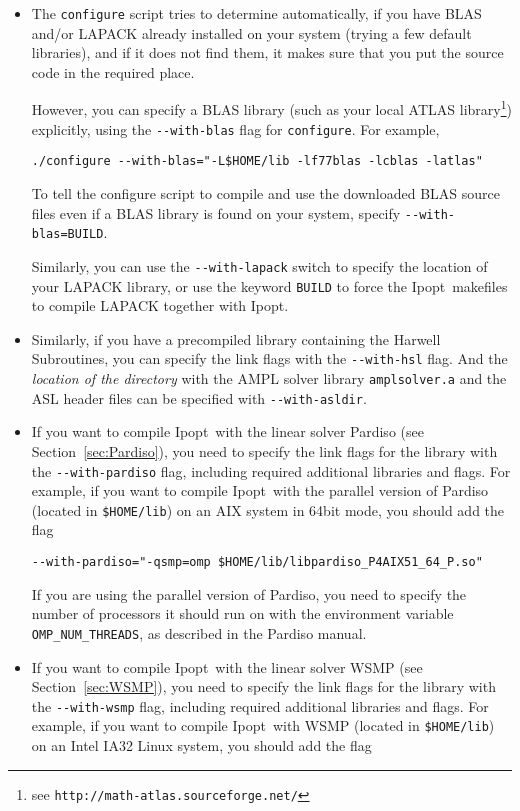 \documentclass[10pt]{article}
\newcommand{\Ipopt}{{\sc Ipopt}}
\begin{document}
\begin{itemize}
\item The {\tt configure} script tries to determine automatically, if
  you have BLAS and/or LAPACK already installed on your system (trying
  a few default libraries), and if it does not find them, it makes
  sure that you put the source code in the required place.

  However, you can specify a BLAS library (such as your local ATLAS
  library\footnote{see {\tt http://math-atlas.sourceforge.net/}})
  explicitly, using the \verb/--with-blas/ flag for {\tt configure}.
  For example,

  \verb|./configure --with-blas="-L$HOME/lib -lf77blas -lcblas -latlas"|

  To tell the configure script to compile and use the downloaded BLAS
  source files even if a BLAS library is found on your system, specify
  \verb|--with-blas=BUILD|.

  Similarly, you can use the \verb/--with-lapack/ switch to specify
  the location of your LAPACK library, or use the keyword {\tt BUILD}
  to force the \Ipopt\ makefiles to compile LAPACK together with
  \Ipopt.

\item Similarly, if you have a precompiled library containing the
  Harwell Subroutines, you can specify the link flags with the
  \verb|--with-hsl| flag.  And the \emph{location of the directory}
  with the AMPL solver library {\tt amplsolver.a} and the ASL header
  files can be specified with \verb|--with-asldir|.

\item If you want to compile \Ipopt\ with the linear solver Pardiso
  (see Section~\ref{sec:Pardiso}), you need to specify the link flags
  for the library with the \verb|--with-pardiso| flag, including
  required additional libraries and flags.  For example, if you want
  to compile \Ipopt\ with the parallel version of Pardiso (located in
  {\tt \$HOME/lib}) on an AIX system in 64bit mode, you should add the
  flag

  \verb|--with-pardiso="-qsmp=omp $HOME/lib/libpardiso_P4AIX51_64_P.so"|

  If you are using the parallel version of Pardiso, you need to
  specify the number of processors it should run on with the
  environment variable \verb|OMP_NUM_THREADS|, as described in the
  Pardiso manual.

\item If you want to compile \Ipopt\ with the linear solver WSMP (see
  Section~\ref{sec:WSMP}), you need to specify the link flags for the
  library with the \verb|--with-wsmp| flag, including required
  additional libraries and flags.  For example, if you want to compile
  \Ipopt\ with WSMP (located in {\tt \$HOME/lib}) on an Intel IA32
  Linux system, you should add the flag


\end{itemize}
\end{document}
